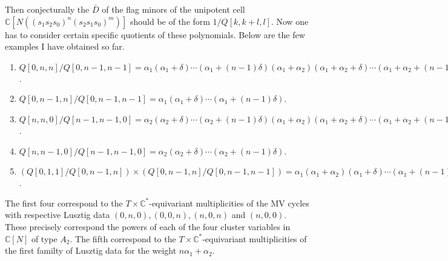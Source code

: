 \documentclass[11pt]{article}
\begin{document}
Then conjecturally the $\bar{D}$ of the flag minors of the unipotent cell $\mathbb{C}[N((s_1s_2s_0)^n(s_2s_1s_0)^m)]$ should be of the form $ 1 / Q[k,k+l,l]$. Now one has to consider certain specific quotients of these polynomials. Below are the few examples I have obtained so far. 
\begin{enumerate}
    \item $Q[0,n,n]/Q[0,n-1,n-1] = \alpha_1 (\alpha_1 + \delta) \cdots (\alpha_1 + (n-1) \delta) (\alpha_1 + \alpha_2)(\alpha_1 + \alpha_2 + \delta) \cdots (\alpha_1 + \alpha_2 + (n-1) \delta)$.
    \item $Q[0,n-1,n]/Q[0,n-1,n-1] = \alpha_1 (\alpha_1 + \delta) \cdots (\alpha_1 + (n-1) \delta)$.
    \item $Q[n,n,0]/Q[n-1,n-1,0] = \alpha_2 (\alpha_2 + \delta) \cdots (\alpha_2 + (n-1) \delta) (\alpha_1 + \alpha_2)(\alpha_1 + \alpha_2 + \delta) \cdots (\alpha_1 + \alpha_2 + (n-1) \delta)$.
    \item $Q[n,n-1,0]/Q[n-1,n-1,0] = \alpha_2 (\alpha_2 + \delta) \cdots (\alpha_2 + (n-1) \delta)$.
    \item $\left( Q[0,1,1]/Q[0,n-1,n] \right) \times \left( Q[0,n-1,n]/Q[0,n-1,n-1] \right) = \alpha_1(\alpha_1 + \alpha_2)  (\alpha_1 + \delta) \cdots (\alpha_1 + (n-1) \delta)$. 
\end{enumerate}

The first four correspond to the $T \times \mathbb{C}^{*}$-equivariant multiplicities of the MV cycles with respective Lusztig data $(0,n,0), (0,0,n), (n,0,n)$ and $(n,0,0)$. These precisely correspond the powers of each of the four cluster variables in $\mathbb{C}[N]$ of type $A_2$. The fifth correspond to the $T \times \mathbb{C}^{*}$-equivariant multiplicities of the first familty of Lusztig data for the weight $n \alpha_1 + \alpha_2$. 
\end{document}
